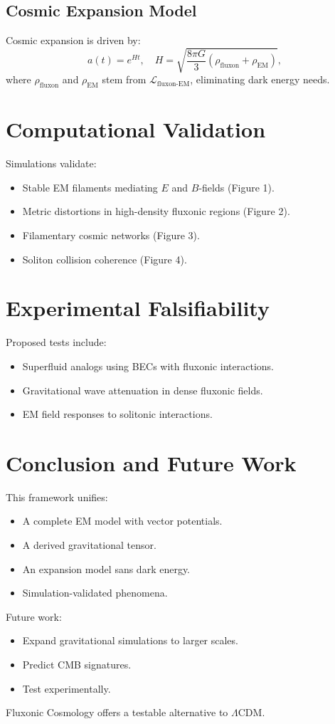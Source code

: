 \documentclass{article}
\begin{document}
\subsection{Cosmic Expansion Model}
Cosmic expansion is driven by:
\begin{equation}
    a(t) = e^{H t}, \quad H = \sqrt{\frac{8 \pi G}{3} \left( \rho_{\text{fluxon}} + \rho_{\text{EM}} \right)},
\end{equation}
where \(\rho_{\text{fluxon}}\) and \(\rho_{\text{EM}}\) stem from \(\mathcal{L}_{\text{fluxon-EM}}\), eliminating dark energy needs.

\section{Computational Validation}
Simulations validate:
\begin{itemize}
    \item Stable EM filaments mediating \( E \) and \( B \)-fields (Figure 1).
    \item Metric distortions in high-density fluxonic regions (Figure 2).
    \item Filamentary cosmic networks (Figure 3).
    \item Soliton collision coherence (Figure 4).
\end{itemize}

\section{Experimental Falsifiability}
Proposed tests include:
\begin{itemize}
    \item Superfluid analogs using BECs with fluxonic interactions.
    \item Gravitational wave attenuation in dense fluxonic fields.
    \item EM field responses to solitonic interactions.
\end{itemize}

\section{Conclusion and Future Work}
This framework unifies:
\begin{itemize}
    \item A complete EM model with vector potentials.
    \item A derived gravitational tensor.
    \item An expansion model sans dark energy.
    \item Simulation-validated phenomena.
\end{itemize}
Future work:
\begin{itemize}
    \item Expand gravitational simulations to larger scales.
    \item Predict CMB signatures.
    \item Test experimentally.
\end{itemize}
Fluxonic Cosmology offers a testable alternative to \(\Lambda\)CDM.
\end{document}
